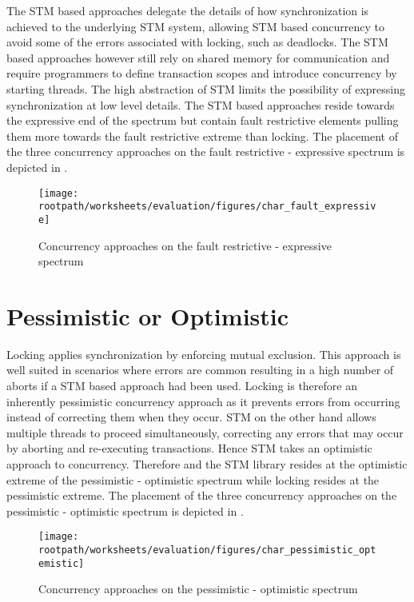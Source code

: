 The \ac{STM} based approaches delegate the details of how synchronization is achieved to the underlying \ac{STM} system, allowing \ac{STM} based concurrency to avoid some of the errors associated with locking, such as deadlocks. The \ac{STM} based approaches however still rely on shared memory for communication and require programmers to define transaction scopes and introduce concurrency by starting threads. The high abstraction of \ac{STM} limits the possibility of expressing synchronization at low level details. The \ac{STM} based approaches reside towards the expressive end of the spectrum but contain fault restrictive elements pulling them more towards the fault restrictive extreme than locking. The placement of the three concurrency approaches on the fault restrictive - expressive spectrum is depicted in .
\begin{figure}[htbp]
\centering
 \texttt{[image: \\rootpath/worksheets/evaluation/figures/char\_fault\_expressive]} 
 \caption{Concurrency approaches on the fault restrictive - expressive spectrum}
\label{fig:char_fault_expressive}
\end{figure}

\section{Pessimistic or Optimistic}
Locking applies synchronization by enforcing mutual exclusion. This approach is well suited in scenarios where errors are common resulting in a high number of aborts if a \ac{STM} based approach had been used. Locking is therefore an inherently pessimistic concurrency approach as it prevents errors from occurring instead of correcting them when they occur. \ac{STM} on the other hand allows multiple threads to proceed simultaneously, correcting any errors that may occur by aborting and re-executing transactions. Hence \ac{STM} takes an optimistic approach to concurrency.
Therefore \stmnamesp and the \ac{STM} library resides at the optimistic extreme of the pessimistic - optimistic spectrum while locking resides at the pessimistic extreme. The placement of the three concurrency approaches on the pessimistic - optimistic spectrum is depicted in . 
\begin{figure}[htbp]
\centering
 \texttt{[image: \\rootpath/worksheets/evaluation/figures/char\_pessimistic\_optemistic]} 
 \caption{Concurrency approaches on the pessimistic - optimistic spectrum}
\label{fig:char_pes_opti}
\end{figure}

